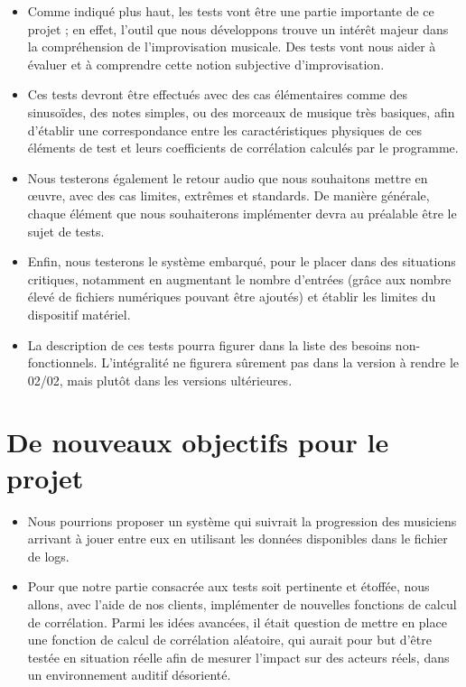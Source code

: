 \documentclass[a4paper]{article}
\begin{document}
\begin{itemize}

\item Comme indiqué plus haut, les tests vont être une partie importante de ce projet ; en effet, l'outil que nous développons trouve un intérêt majeur dans la compréhension de l'improvisation musicale. Des tests vont nous aider à évaluer et à comprendre cette notion subjective d'improvisation.

\item Ces tests devront être effectués avec des cas élémentaires comme des sinusoïdes, des notes simples, ou des morceaux de musique très basiques, afin d'établir une correspondance entre les caractéristiques physiques de ces éléments de test et leurs coefficients de corrélation calculés par le programme.

\item Nous testerons également le retour audio que nous souhaitons mettre en œuvre, avec des cas limites, extrêmes et standards. De manière générale, chaque élément que nous souhaiterons implémenter devra au préalable être le sujet de tests.

\item Enfin, nous testerons le système embarqué, pour le placer dans des situations critiques, notamment en augmentant le nombre d'entrées (grâce aux nombre élevé de fichiers numériques pouvant être ajoutés) et établir les limites du dispositif matériel.

\item La description de ces tests pourra figurer dans la liste des besoins non-fonctionnels. L'intégralité ne figurera sûrement pas dans la version à rendre le 02/02, mais plutôt dans les versions ultérieures.

\end{itemize}

\section*{De nouveaux objectifs pour le projet}

\begin{itemize}

\item Nous pourrions proposer un système qui suivrait la progression des musiciens arrivant à jouer entre eux en utilisant les données disponibles dans le fichier de logs.

\item Pour que notre partie consacrée aux tests soit pertinente et étoffée, nous allons, avec l'aide de nos clients, implémenter de nouvelles fonctions de calcul de corrélation. Parmi les idées avancées, il était question de mettre en place une fonction de calcul de corrélation aléatoire, qui aurait pour but d'être testée en situation réelle afin de mesurer l'impact sur des acteurs réels, dans un environnement auditif désorienté.

\end{itemize}
\end{document}

